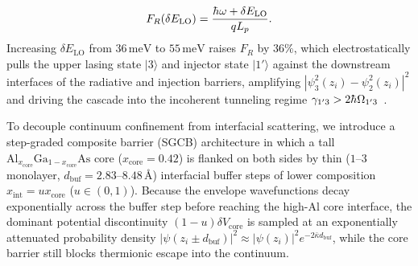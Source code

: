\documentclass[11pt,letterpaper]{article}
\renewcommand{\hbar}{\mathchar'26\mkern-9mu h}
\begin{document}
\begin{enumerate}
    \begin{equation}
    F_R(\delta E_{\mathrm{LO}}) = \frac{\hbar\omega + \delta E_{\mathrm{LO}}}{q L_p}.
    \label{eq:intro_field}
    \end{equation}
    Increasing $\delta E_{\mathrm{LO}}$ from $36\,\mathrm{meV}$ to $55\,\mathrm{meV}$ raises $F_R$ by $36\%$, which electrostatically pulls the upper lasing state $|3\rangle$ and injector state $|1'\rangle$ against the downstream interfaces of the radiative and injection barriers, amplifying $|\psi_3^2(z_i) - \psi_2^2(z_i)|^2$ and driving the cascade into the incoherent tunneling regime $\gamma_{1'3} > 2\hbar\Omega_{1'3}$~\cite{Kazarinov1972,Vurgaftman2021}.
\end{enumerate}

To decouple continuum confinement from interfacial scattering, we introduce a step-graded composite barrier (SGCB) architecture in which a tall $\mathrm{Al}_{x_{\mathrm{core}}}\mathrm{Ga}_{1-x_{\mathrm{core}}}\mathrm{As}$ core ($x_{\mathrm{core}} = 0.42$) is flanked on both sides by thin ($1\text{--}3$ monolayer, $d_{\mathrm{buf}} = 2.83\text{--}8.48$\,\AA) interfacial buffer steps of lower composition $x_{\mathrm{int}} = u x_{\mathrm{core}}$ ($u \in (0,1)$). Because the envelope wavefunctions decay exponentially across the buffer step before reaching the high-$\mathrm{Al}$ core interface, the dominant potential discontinuity $(1-u)\delta V_{\mathrm{core}}$ is sampled at an exponentially attenuated probability density $|\psi(z_i \pm d_{\mathrm{buf}})|^2 \approx |\psi(z_i)|^2 e^{-2\bar{\kappa} d_{\mathrm{buf}}}$, while the core barrier still blocks thermionic escape into the continuum.
\end{document}
